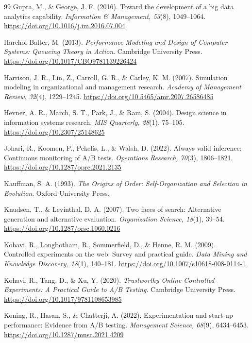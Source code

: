 \documentclass[preprint,12pt,authoryear]{elsarticle}
\providecommand{\doi}[1]{\url{https://doi.org/#1}}
\theoremstyle{definition}
\begin{document}
\begin{thebibliography}{99}
 Gupta, M., \& George, J. F. (2016). Toward the development of a big data analytics capability. \textit{Information \& Management, 53}(8), 1049--1064. \doi{10.1016/j.im.2016.07.004}

 Harchol-Balter, M. (2013). \textit{Performance Modeling and Design of Computer Systems: Queueing Theory in Action}. Cambridge University Press. \doi{10.1017/CBO9781139226424}

 Harrison, J. R., Lin, Z., Carroll, G. R., \& Carley, K. M. (2007). Simulation modeling in organizational and management research. \textit{Academy of Management Review, 32}(4), 1229--1245. \doi{10.5465/amr.2007.26586485}

 Hevner, A. R., March, S. T., Park, J., \& Ram, S. (2004). Design science in information systems research. \textit{MIS Quarterly, 28}(1), 75--105. \doi{10.2307/25148625}

 Johari, R., Koomen, P., Pekelis, L., \& Walsh, D. (2022). Always valid inference: Continuous monitoring of A/B tests. \textit{Operations Research, 70}(3), 1806--1821. \doi{10.1287/opre.2021.2135}

 Kauffman, S. A. (1993). \textit{The Origins of Order: Self-Organization and Selection in Evolution}. Oxford University Press.

 Knudsen, T., \& Levinthal, D. A. (2007). Two faces of search: Alternative generation and alternative evaluation. \textit{Organization Science, 18}(1), 39--54. \doi{10.1287/orsc.1060.0216}

 Kohavi, R., Longbotham, R., Sommerfield, D., \& Henne, R. M. (2009). Controlled experiments on the web: Survey and practical guide. \textit{Data Mining and Knowledge Discovery, 18}(1), 140--181. \doi{10.1007/s10618-008-0114-1}

 Kohavi, R., Tang, D., \& Xu, Y. (2020). \textit{Trustworthy Online Controlled Experiments: A Practical Guide to A/B Testing}. Cambridge University Press. \doi{10.1017/9781108653985}

 Koning, R., Hasan, S., \& Chatterji, A. (2022). Experimentation and start-up performance: Evidence from A/B testing. \textit{Management Science, 68}(9), 6434--6453. \doi{10.1287/mnsc.2021.4209}


\end{thebibliography}
\end{document}
